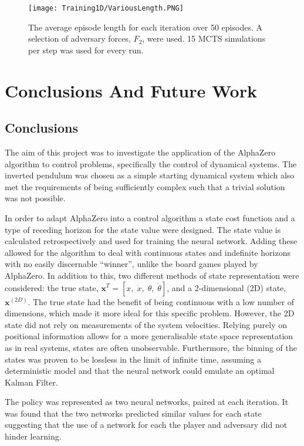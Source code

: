 \documentclass[../main.tex]{subfiles}
\begin{document}
\begin{figure}[H]
    \centering
    \texttt{[image: Training1D/VariousLength.PNG]}
    \caption{The average episode length for each iteration over 50 episodes. A selection of adversary forces, $F_2$, were used. 15 MCTS simulations per step was used for every run.}
    \label{fig:rand}
\end{figure}

\chapter{Conclusions And Future Work}

\section{Conclusions}

The aim of this project was to investigate the application of the AlphaZero algorithm to control problems, specifically the control of dynamical systems. The inverted pendulum was chosen as a simple starting dynamical system which also met the requirements of being sufficiently complex such that a trivial solution was not possible.

In order to adapt AlphaZero into a control algorithm a state cost function and a type of receding horizon for the state value were designed. The state value is calculated retrospectively and used for training the neural network. Adding these allowed for the algorithm to deal with continuous states and indefinite horizons with no easily discernable ``winner'', unlike the board games played by AlphaZero. In addition to this, two different methods of state representation were considered: the true state, $\boldsymbol{x}^T=[x, \; \dot{x}, \; \theta, \; \dot{\theta}]$, and a 2-dimensional (2D) state, $\boldsymbol{x}^{(2D)}$. The true state had the benefit of being continuous with a low number of dimensions, which made it more ideal for this specific problem. However, the 2D state did not rely on measurements of the system velocities. Relying purely on positional information allows for a more generalisable state space representation as in real systems, states are often unobservable. Furthermore, the binning of the states was proven to be lossless in the limit of infinite time, assuming a deterministic model and that the neural network could emulate an optimal Kalman Filter.

The policy was represented as two neural networks, paired at each iteration. It was found that the two networks predicted similar values for each state suggesting that the use of a network for each the player and adversary did not hinder learning.
\end{document}
